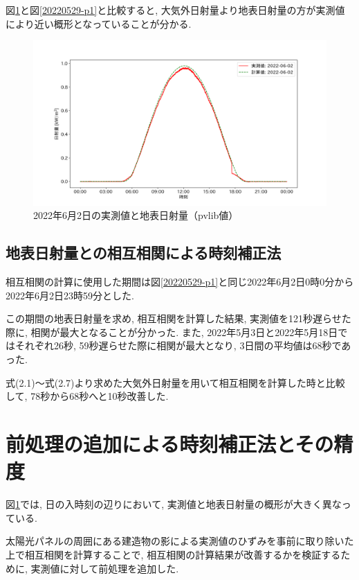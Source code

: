 図\ref{2-p1}と図\ref{20220529-p1}と比較すると, 大気外日射量より地表日射量の方が実測値により近い概形となっていることが分かる.

\begin{figure}[H]
  \begin{center}
    \includegraphics[width=160mm]{sotu/figure/2/pvlib-20220602-corr.png}
    \caption{2022年6月2日の実測値と地表日射量（pvlib値）}
    \label{2-p1}
  \end{center}
\end{figure}

\subsection{地表日射量との相互相関による時刻補正法}
相互相関の計算に使用した期間は図\ref{20220529-p1}と同じ2022年6月2日0時0分から2022年6月2日23時59分とした.

この期間の地表日射量を求め, 相互相関を計算した結果, 実測値を121秒遅らせた際に, 相関が最大となることが分かった.  また, 2022年5月3日と2022年5月18日ではそれぞれ26秒, 59秒遅らせた際に相関が最大となり, 3日間の平均値は68秒であった.

式(2.1)～式(2.7)より求めた大気外日射量を用いて相互相関を計算した時と比較して, 78秒から68秒へと10秒改善した.

\section{前処理の追加による時刻補正法とその精度}

図\ref{2-p1}では, 日の入時刻の辺りにおいて, 実測値と地表日射量の概形が大きく異なっている.

太陽光パネルの周囲にある建造物の影による実測値のひずみを事前に取り除いた上で相互相関を計算することで, 相互相関の計算結果が改善するかを検証するために, 実測値に対して前処理を追加した.

